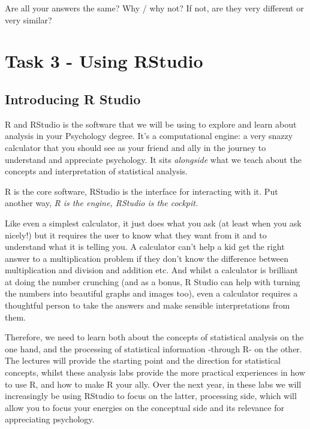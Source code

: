 \documentclass[
]{book}
\begin{document}
Are all your answers the same? Why / why not? If not, are they very different or very similar?

\hypertarget{task-3---using-rstudio}{%
\section{Task 3 - Using RStudio}\label{task-3---using-rstudio}}

\hypertarget{introducing-r-studio}{%
\subsection{Introducing R Studio}\label{introducing-r-studio}}

R and RStudio is the software that we will be using to explore and learn about analysis in your Psychology degree. It's a computational engine: a very snazzy calculator that you should see as your friend and ally in the journey to understand and appreciate psychology. It sits \emph{alongside} what we teach about the concepts and interpretation of statistical analysis.

R is the core software, RStudio is the interface for interacting with it. Put another way, \emph{R is the engine, RStudio is the cockpit.}

Like even a simplest calculator, it just does what you ask (at least when you ask nicely!) but it requires the user to know what they want from it and to understand what it is telling you. A calculator can't help a kid get the right answer to a multiplication problem if they don't know the difference between multiplication and division and addition etc. And whilst a calculator is brilliant at doing the number crunching (and as a bonus, R Studio can help with turning the numbers into beautiful graphs and images too), even a calculator requires a thoughtful person to take the answers and make sensible interpretations from them.

Therefore, we need to learn both about the concepts of statistical analysis on the one hand, and the processing of statistical information -through R- on the other. The lectures will provide the starting point and the direction for statistical concepts, whilst these analysis labs provide the more practical experiences in how to use R, and how to make R your ally. Over the next year, in these labs we will increasingly be using RStudio to focus on the latter, processing side, which will allow you to focus your energies on the conceptual side and its relevance for appreciating psychology.
\end{document}

